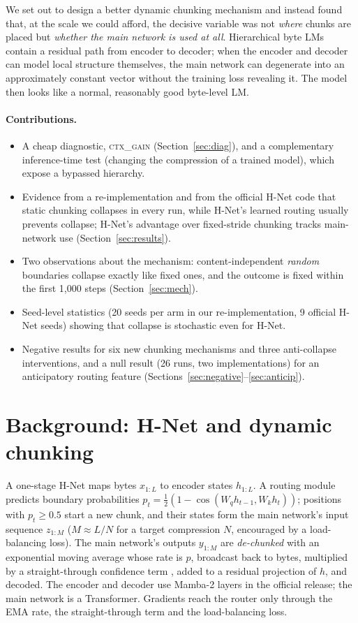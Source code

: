 \documentclass[10pt]{article}
\newcommand{\ctx}{\textsc{ctx\_gain}}
\begin{document}
We set out to design a better dynamic chunking mechanism and instead found that, at the scale we
could afford, the decisive variable was not \emph{where} chunks are placed but \emph{whether the main network
is used at all}. Hierarchical byte LMs contain a residual path from encoder to decoder; when the
encoder and decoder can model local structure themselves, the main network can degenerate into
an approximately constant vector without the training loss revealing it. The model then looks
like a normal, reasonably good byte-level LM.

\paragraph{Contributions.}
\begin{itemize}
\item A cheap diagnostic, \ctx{} (Section~\ref{sec:diag}), and a complementary inference-time
  test (changing the compression of a trained model), which expose a bypassed hierarchy.
\item Evidence from a re-implementation and from the official H-Net code that static chunking
  collapses in every run, while H-Net's learned routing usually prevents collapse; H-Net's
  advantage over fixed-stride chunking tracks main-network use (Section~\ref{sec:results}).
\item Two observations about the mechanism: content-independent \emph{random} boundaries collapse
  exactly like fixed ones, and the outcome is fixed within the first 1{,}000 steps
  (Section~\ref{sec:mech}).
\item Seed-level statistics (20 seeds per arm in our re-implementation, 9 official H-Net seeds)
  showing that collapse is stochastic even for H-Net.
\item Negative results for six new chunking mechanisms and three anti-collapse interventions,
  and a null result (26 runs, two implementations) for an anticipatory routing feature
  (Sections~\ref{sec:negative}--\ref{sec:anticip}).
\end{itemize}

\section{Background: H-Net and dynamic chunking}
\label{sec:background}

A one-stage H-Net \citep{hwang2025hnet} maps bytes $x_{1:L}$ to encoder states $h_{1:L}$. A
routing module predicts boundary probabilities $p_t = \tfrac12(1-\cos(W_q h_{t-1}, W_k h_t))$;
positions with $p_t\ge 0.5$ start a new chunk, and their states form the main network's input
sequence $z_{1:M}$ ($M\approx L/N$ for a target compression $N$, encouraged by a
load-balancing loss). The main network's outputs $y_{1:M}$ are \emph{de-chunked} with an
exponential moving average whose rate is $p$, broadcast back to bytes, multiplied by a
straight-through confidence term \citep{bengio2013ste}, added to a residual projection of
$h$, and decoded. The encoder and decoder use Mamba-2 \citep{dao2024mamba2} layers in the
official release; the main network is a Transformer. Gradients reach the router only through the EMA rate, the straight-through term and the load-balancing loss.
\end{document}
